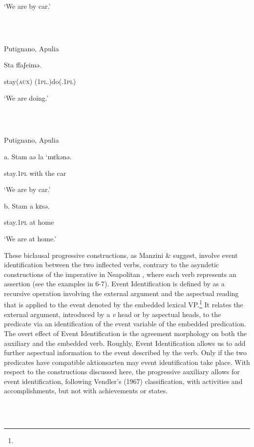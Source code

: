 \documentclass[output=paper]{langsci/langscibook}
\begin{document}
‘We are by car.’

\ea%
    \label{ex:key:36}
    \gll\\
        \\
    \glt
    \z

          Putignano, Apulia

Sta     ffaʃeimə.

stay\textsc{(aux)}   (\textsc{1pl.})do(.\textsc{1pl})        

‘We are doing.’

\ea%
    \label{ex:key:37}
    \gll\\
        \\
    \glt
    \z

          Putignano, Apulia

a.  Stam    aə  la  ‘mɛkənə.

stay.\textsc{1pl}   with  the  car

‘We are by car.’

b.  Stam     a   kɛsə.

stay.\textsc{1pl}   at  home 

‘We are at home.’

These biclausal progressive constructions, as Manzini \& \citet{Savoia2005} suggest, involve event identification between the two inflected verbs, contrary to the asyndetic constructions of the imperative in Neapolitan \citep{Ledgeway1997}, where each verb represents an assertion (see the examples in 6-7). Event Identification is defined by \citet{Kratzer1996} as a recursive operation involving the external argument and the aspectual reading that is applied to the event denoted by the embedded lexical VP.\footnote{} It relates the external argument, introduced by a \textit{v} head or by aspectual heads, to the predicate via an identification of the event variable of the embedded predication. The overt effect of Event Identification is  the agreement morphology on both the auxiliary and the embedded verb. Roughly, Event Identification allows us to add further aspectual information to the event described by the verb. Only if the two predicates have compatible aktionsarten may event identification take place. With respect to the constructions discussed here, the progressive auxiliary allows for event identification, following Vendler’s (1967) classification, with activities and accomplishments, but not with achievements or states.

\ea%
    \label{ex:key:38}
    \gll\\
        \\
    \glt
    \z
\end{document}
